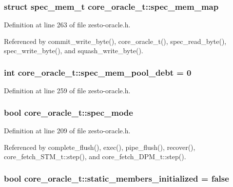 \subsubsection[{spec\_\-mem\_\-map}]{\setlength{\rightskip}{0pt plus 5cm}struct {\bf spec\_\-mem\_\-t} {\bf core\_\-oracle\_\-t::spec\_\-mem\_\-map}\hspace{0.3cm}{\tt  [read, protected]}}\label{classcore__oracle__t_46aeda5c32e396e6f8adfc6cb3c7537c}




Definition at line 263 of file zesto-oracle.h.

Referenced by commit\_\-write\_\-byte(), core\_\-oracle\_\-t(), spec\_\-read\_\-byte(), spec\_\-write\_\-byte(), and squash\_\-write\_\-byte().
\subsubsection[{spec\_\-mem\_\-pool\_\-debt}]{\setlength{\rightskip}{0pt plus 5cm}int {\bf core\_\-oracle\_\-t::spec\_\-mem\_\-pool\_\-debt} = 0\hspace{0.3cm}{\tt  [static, protected]}}\label{classcore__oracle__t_d0134179be9ff7029eba7c0dc3b448d4}




Definition at line 259 of file zesto-oracle.h.
\subsubsection[{spec\_\-mode}]{\setlength{\rightskip}{0pt plus 5cm}bool {\bf core\_\-oracle\_\-t::spec\_\-mode}}\label{classcore__oracle__t_c3d9d77c3cc61cac13be93461b663fbb}




Definition at line 209 of file zesto-oracle.h.

Referenced by complete\_\-flush(), exec(), pipe\_\-flush(), recover(), core\_\-fetch\_\-STM\_\-t::step(), and core\_\-fetch\_\-DPM\_\-t::step().
\subsubsection[{static\_\-members\_\-initialized}]{\setlength{\rightskip}{0pt plus 5cm}bool {\bf core\_\-oracle\_\-t::static\_\-members\_\-initialized} = false\hspace{0.3cm}{\tt  [static, protected]}}\label{classcore__oracle__t_b19f952d312b7f51f6b5c7e6cabfac7b}




